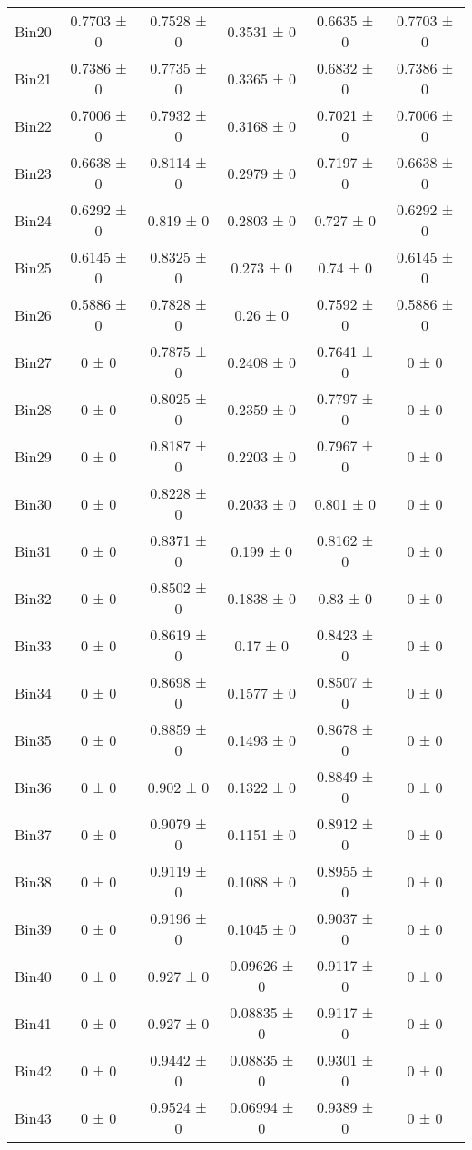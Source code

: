 \begin{tabular}{@{\extracolsep{4pt}}lccccc@{}}
     Bin20 & 0.7703 ± 0 & 0.7528 ± 0 & 0.3531 ± 0 & 0.6635 ± 0 & 0.7703 ± 0 \\ 
     Bin21 & 0.7386 ± 0 & 0.7735 ± 0 & 0.3365 ± 0 & 0.6832 ± 0 & 0.7386 ± 0 \\ 
     Bin22 & 0.7006 ± 0 & 0.7932 ± 0 & 0.3168 ± 0 & 0.7021 ± 0 & 0.7006 ± 0 \\ 
     Bin23 & 0.6638 ± 0 & 0.8114 ± 0 & 0.2979 ± 0 & 0.7197 ± 0 & 0.6638 ± 0 \\ 
     Bin24 & 0.6292 ± 0 & 0.819 ± 0 & 0.2803 ± 0 & 0.727 ± 0 & 0.6292 ± 0 \\ 
     Bin25 & 0.6145 ± 0 & 0.8325 ± 0 & 0.273 ± 0 & 0.74 ± 0 & 0.6145 ± 0 \\ 
     Bin26 & 0.5886 ± 0 & 0.7828 ± 0 & 0.26 ± 0 & 0.7592 ± 0 & 0.5886 ± 0 \\ 
     Bin27 & 0 ± 0 & 0.7875 ± 0 & 0.2408 ± 0 & 0.7641 ± 0 & 0 ± 0 \\ 
     Bin28 & 0 ± 0 & 0.8025 ± 0 & 0.2359 ± 0 & 0.7797 ± 0 & 0 ± 0 \\ 
     Bin29 & 0 ± 0 & 0.8187 ± 0 & 0.2203 ± 0 & 0.7967 ± 0 & 0 ± 0 \\ 
     Bin30 & 0 ± 0 & 0.8228 ± 0 & 0.2033 ± 0 & 0.801 ± 0 & 0 ± 0 \\ 
     Bin31 & 0 ± 0 & 0.8371 ± 0 & 0.199 ± 0 & 0.8162 ± 0 & 0 ± 0 \\ 
     Bin32 & 0 ± 0 & 0.8502 ± 0 & 0.1838 ± 0 & 0.83 ± 0 & 0 ± 0 \\ 
     Bin33 & 0 ± 0 & 0.8619 ± 0 & 0.17 ± 0 & 0.8423 ± 0 & 0 ± 0 \\ 
     Bin34 & 0 ± 0 & 0.8698 ± 0 & 0.1577 ± 0 & 0.8507 ± 0 & 0 ± 0 \\ 
     Bin35 & 0 ± 0 & 0.8859 ± 0 & 0.1493 ± 0 & 0.8678 ± 0 & 0 ± 0 \\ 
     Bin36 & 0 ± 0 & 0.902 ± 0 & 0.1322 ± 0 & 0.8849 ± 0 & 0 ± 0 \\ 
     Bin37 & 0 ± 0 & 0.9079 ± 0 & 0.1151 ± 0 & 0.8912 ± 0 & 0 ± 0 \\ 
     Bin38 & 0 ± 0 & 0.9119 ± 0 & 0.1088 ± 0 & 0.8955 ± 0 & 0 ± 0 \\ 
     Bin39 & 0 ± 0 & 0.9196 ± 0 & 0.1045 ± 0 & 0.9037 ± 0 & 0 ± 0 \\ 
     Bin40 & 0 ± 0 & 0.927 ± 0 & 0.09626 ± 0 & 0.9117 ± 0 & 0 ± 0 \\ 
     Bin41 & 0 ± 0 & 0.927 ± 0 & 0.08835 ± 0 & 0.9117 ± 0 & 0 ± 0 \\ 
     Bin42 & 0 ± 0 & 0.9442 ± 0 & 0.08835 ± 0 & 0.9301 ± 0 & 0 ± 0 \\ 
     Bin43 & 0 ± 0 & 0.9524 ± 0 & 0.06994 ± 0 & 0.9389 ± 0 & 0 ± 0 \\ 

\end{tabular}
